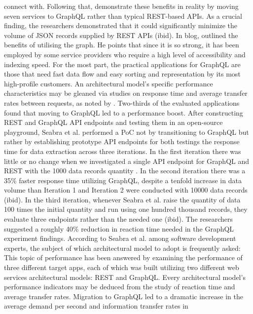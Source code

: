connect with. Following that, \citet{britoMigratingGraphQLPractical2019}
demonstrate these benefits in reality by moving seven services to GraphQL rather
than typical REST-based APIs. As a crucial finding, the researchers demonstrated
that it could significantly minimize the volume of JSON records supplied by REST
APIs (ibid). In blog, \citet{kristopherUniqueBenefitsUsing2018}
outlined the benefits of utilising the graph. He points that since it is so
strong, it has been employed by some service providers who require a high level
of accessibility and indexing speed. For the most part, the practical
applications for GraphQL are those that need fast data flow and easy sorting and
representation by its most high-profile customers. An architectural model's
specific performance characteristics may be gleaned via studies on response time
and average transfer rates between requests, as noted by
\citet{seabraRESTGraphQLPerformance2019}. Two-thirds of the evaluated
applications found that moving to GraphQL led to a performance boost. After
constructing REST and GraphQL API endpoints and testing them in an open-source
playground, Seabra et al. performed a PoC not by transitioning to
GraphQL but rather by establishing prototype API endpoints for both testings the
response time for data extraction across three iterations. In the first
iteration there was little or no change when we investigated a single API
endpoint for GraphQL and REST with the 1000 data records quantity
\citep{seabraRESTGraphQLPerformance2019}. In the second iteration there was a
35\% faster response time utilizing GraphQL, despite a tenfold increase in data
volume than Iteration 1 and Iteration 2 were conducted with 10000 data records
(ibid). In the third iteration, whenever Seabra et al. raise the quantity of
data 100 times the initial quantity and run using one hundred thousand records, they
evaluate three endpoints rather than the needed one (ibid). The
researchers suggested a roughly 40\% reduction in reaction time needed in
the GraphQL experiment findings. According to Seabra et al. among software
development experts, the subject of which architectural model to adopt is
frequently asked: This topic of performance has been answered by examining the
performance of three different target apps, each of which was built utilizing
two different web services architectural models: REST and GraphQL. Every
architectural model's performance indicators may be deduced from the study of
reaction time and average transfer rates. Migration to GraphQL led to a dramatic
increase in the average demand per second and information transfer rates in
